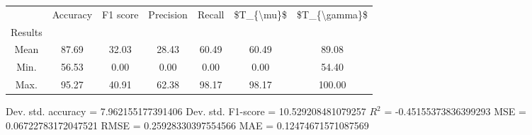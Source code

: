 \begin{tabular}{|c|c|c|c|c|c|c|}
\toprule
{} &  Accuracy &  F1 score &  Precision &  Recall &  \$T\_\{\textbackslash mu\}\$ &  \$T\_\{\textbackslash gamma\}\$ \\
Results &           &           &            &         &            &               \\
\hline
Mean    &     87.69 &     32.03 &      28.43 &   60.49 &      60.49 &         89.08 \\
Min.    &     56.53 &      0.00 &       0.00 &    0.00 &       0.00 &         54.40 \\
Max.    &     95.27 &     40.91 &      62.38 &   98.17 &      98.17 &        100.00 \\
\bottomrule
\end{tabular}

 Dev. std. accuracy = 7.962155177391406
 Dev. std. F1-score = 10.529208481079257
 $R^2$ = -0.45155373836399293
 MSE = 0.06722783172047521
 RMSE = 0.25928330397554566
 MAE = 0.12474671571087569